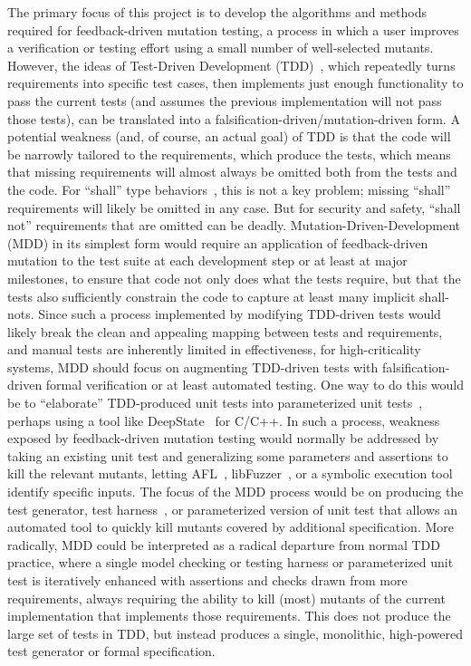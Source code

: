 The primary focus of this project is to develop the algorithms and methods required for feedback-driven mutation testing, a process in which a user improves a verification or testing effort using a small number of well-selected mutants.  However, the ideas of Test-Driven Development (TDD)~\cite{TDD,TDDFuture}, which repeatedly turns requirements into specific test cases, then implements just enough functionality to pass the current tests (and assumes the previous implementation will not pass those tests), can be translated into a falsification-driven/mutation-driven form.  A potential weakness (and, of course, an actual goal) of TDD is that the code will be narrowly tailored to the requirements, which produce the tests, which means that missing requirements will almost always be omitted both from the tests and the code.  For ``shall'' type behaviors~\cite{INCOSE}, this is not a key problem; missing ``shall'' requirements will likely be omitted in any case.  But for security and safety, ``shall not'' requirements that are omitted can be deadly.  Mutation-Driven-Development (MDD) in its simplest form would require an application of feedback-driven mutation to the test suite at each development step or at least at major milestones, to ensure that code not only does what the tests require, but that the tests also sufficiently constrain the code to capture at least many implicit shall-nots.  Since such a process implemented by modifying TDD-driven tests would likely break the clean and appealing mapping between tests and requirements, and manual tests are inherently limited in effectiveness, for high-criticality systems, MDD should focus on augmenting TDD-driven tests with falsification-driven formal verification or at least automated testing.  One way to do this would be to ``elaborate'' TDD-produced unit tests into parameterized unit tests~\cite{UnitMeister,ParamUnit}, perhaps using a tool like DeepState~\cite{DeepState} for C/C++.  In such a process, weakness exposed by feedback-driven mutation testing would normally be addressed by taking an existing unit test and generalizing some parameters and assertions to kill the relevant mutants, letting AFL~\cite{aflfuzz}, libFuzzer~\cite{libfuzzer}, or a symbolic execution tool~\cite{angr1,angr2,manticore} identify specific inputs.  The focus of the MDD process would be on producing the test generator, test harness~\cite{WODACommon,tstlsttt}, or parameterized version of unit test that allows an automated tool to quickly kill mutants covered by additional specification.  More radically, MDD could be interpreted as a radical departure from normal TDD practice, where a single model checking or testing harness or parameterized unit test is iteratively enhanced with assertions and checks drawn from more requirements, always requiring the ability to kill (most) mutants of the current implementation that implements those requirements.  This does not produce the large set of tests in TDD, but instead produces a single, monolithic, high-powered test generator or formal specification.


